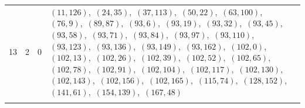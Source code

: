 \documentclass[11pt]{article}
\begin{document}
\begin{longtable}{@{}rrl>{\raggedright\arraybackslash}p{}@{}}
13 & 2 & $0$ & $(11,126)$,\allowbreak\ $(24,35)$,\allowbreak\ $(37,113)$,\allowbreak\ $(50,22)$,\allowbreak\ $(63,100)$,\allowbreak\ $(76,9)$,\allowbreak\ $(89,87)$,\allowbreak\ $(93,6)$,\allowbreak\ $(93,19)$,\allowbreak\ $(93,32)$,\allowbreak\ $(93,45)$,\allowbreak\ $(93,58)$,\allowbreak\ $(93,71)$,\allowbreak\ $(93,84)$,\allowbreak\ $(93,97)$,\allowbreak\ $(93,110)$,\allowbreak\ $(93,123)$,\allowbreak\ $(93,136)$,\allowbreak\ $(93,149)$,\allowbreak\ $(93,162)$,\allowbreak\ $(102,0)$,\allowbreak\ $(102,13)$,\allowbreak\ $(102,26)$,\allowbreak\ $(102,39)$,\allowbreak\ $(102,52)$,\allowbreak\ $(102,65)$,\allowbreak\ $(102,78)$,\allowbreak\ $(102,91)$,\allowbreak\ $(102,104)$,\allowbreak\ $(102,117)$,\allowbreak\ $(102,130)$,\allowbreak\ $(102,143)$,\allowbreak\ $(102,156)$,\allowbreak\ $(102,165)$,\allowbreak\ $(115,74)$,\allowbreak\ $(128,152)$,\allowbreak\ $(141,61)$,\allowbreak\ $(154,139)$,\allowbreak\ $(167,48)$\\
\addlinespace[3pt]
\end{longtable}
\endgroup
\end{document}
